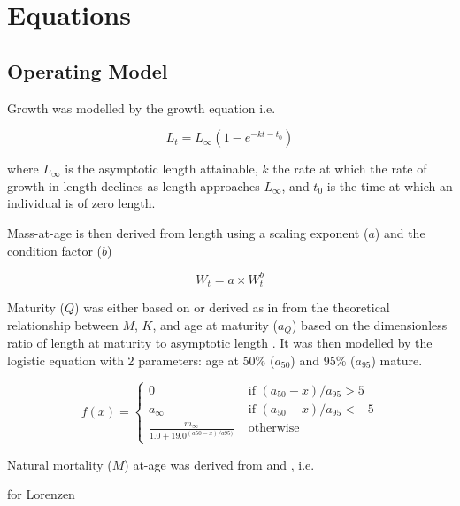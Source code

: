 \documentclass[%
nonumbib,      %
%
]{nrc1}                          %
\begin{document}
\newpage\clearpage
\section*{Equations}

\subsection*{Operating Model}

Growth was modelled by the \cite{vonbert1957quantitative} growth equation i.e.
 
\begin{equation} L_t = L_{\infty}(1 - e^{-kt-t_0}) \end{equation} 
 
where $L_{\infty}$ is the asymptotic length attainable, $k$ the rate at which the rate of growth in length declines as length approaches
$L_{\infty}$, and $t_{0}$ is the time at which an individual is of zero length. 
 
Mass-at-age is then derived from length using a scaling exponent ($a$) and the condition factor ($b$)
 
\begin{equation} W_t = a \times W_t^b \end{equation} 
 
Maturity ($Q$) was either based on \cite{santiago2004dinamica}  or derived as in \cite{williams2003implications} 
from the theoretical relationship between $M$, $K$, and age at maturity ($a_{Q}$)  
based on the dimensionless ratio of length at maturity to asymptotic length \citep{beverton1992patterns}. It was then  
modelled by the logistic equation with 2 parameters: age at 50\% ($a_{50}$) and 95\% ($a_{95}$) mature.

\begin{equation}
f(x) = \left\{ \begin{array}{ll}
			0                                 &\mbox{ if $(a_{50}-x)/a_{95} >  5$} \\
			a_{\infty}                        &\mbox{ if $(a_{50}-x)/a_{95} < -5$} \\
			\frac{m_{\infty}}{1.0+19.0^{(a50-x)/{a95})}} &\mbox{ otherwise}
		\end{array}
       \right.
\end{equation}

Natural mortality ($M$) at-age was derived from \cite{lorenzen2002density} and \cite{chen1989age}, i.e.

for Lorenzen
 
\end{document}
